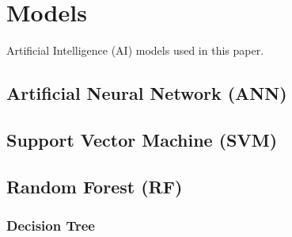 \section{Models}\label{Models}

Artificial Intelligence (AI) models used in this paper.

\subsection{Artificial Neural Network (ANN)}



\subsection{Support Vector Machine (SVM)}



\subsection{Random Forest (RF)}


\subsubsection{Decision Tree}


